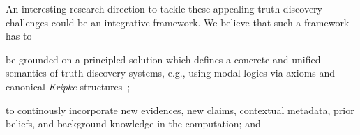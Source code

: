 \documentclass[prodmode,acmtecs]{acmsmall} %
\begin{document}
An interesting research direction to tackle these appealing truth discovery challenges could be an integrative
framework. We believe that such a framework has to
\begin{inparaenum}[(i)]
\item be grounded on a principled solution which defines a concrete and unified semantics of truth discovery systems, e.g., using
modal logics via axioms and canonical 
\emph{Kripke} structures~\cite{GorankoOtto06};
\item to continously incorporate new evidences, new claims, contextual metadata, prior beliefs, and background knowledge in the computation; and
\item 
\end{inparaenum}









\medskip
\end{document}
